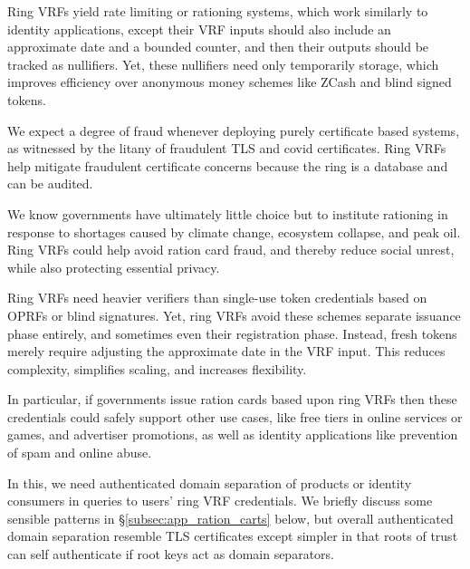 Ring VRFs yield rate limiting or rationing systems, which work
similarly to identity applications, except their VRF inputs should also
include an approximate date and a bounded counter, and
 then their outputs should be tracked as nullifiers.
Yet, these nullifiers need only temporarily storage, which improves 
efficiency over anonymous money schemes like ZCash and blind signed tokens.

We expect a degree of fraud whenever deploying purely certificate
based systems, as witnessed by the litany of fraudulent TLS and covid
certificates.  Ring VRFs help mitigate fraudulent certificate concerns
because the ring is a database and can be audited.

We know governments have ultimately little choice but to institute
rationing in response to shortages caused by climate change, ecosystem
collapse, and peak oil.  Ring VRFs could help avoid ration card fraud,
and thereby reduce social unrest, while also protecting essential privacy.

Ring VRFs need heavier verifiers than single-use token credentials
based on OPRFs \cite{PrivacyPass} or blind signatures.
Yet, ring VRFs avoid these schemes separate issuance phase entirely,
and sometimes even their registration phase.  Instead, fresh tokens
merely require adjusting the approximate date in the VRF input.
This reduces complexity, simplifies scaling, and increases flexibility.

In particular, if governments issue ration cards based upon ring VRFs
then these credentials could safely support other use cases, like
free tiers in online services or games, and advertiser promotions,
as well as identity applications like prevention of spam and online abuse.

In this, we need authenticated domain separation of products or identity
consumers in queries to users' ring VRF credentials.  We briefly discuss
some sensible patterns in \S\ref{subsec:app_ration_carts} below, but
overall authenticated domain separation resemble TLS certificates except
simpler in that roots of trust can self authenticate if root keys act as
domain separators.





\endinput




As a field, anonymous credentials come in myriad flavors,
many of which exist to limits the anonymity provided, ala
 attribute based credentials and group signatures. %
%
Ring VRFs by weakening anonymity only contextually provide a safer,
more private, more flexible, more powerful, and more ethical
choice for all everyday anonymous credential use cases.  %


